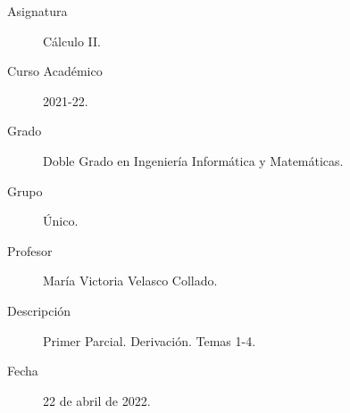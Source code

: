 \documentclass[12pt]{article}
\begin{document}

    
    

    \begin{description}
        \item[Asignatura] Cálculo II.
        \item[Curso Académico] 2021-22.
        \item[Grado] Doble Grado en Ingeniería Informática y Matemáticas.
        \item[Grupo] Único.
        \item[Profesor] María Victoria Velasco Collado.
        \item[Descripción] Primer Parcial. Derivación. Temas 1-4.
        \item[Fecha] 22 de abril de 2022.
    
    \end{description}
    \newpage
    
\end{document}
